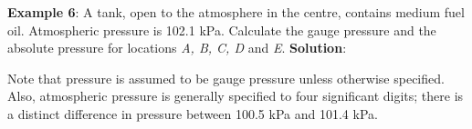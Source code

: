 \documentclass[10pt]{amsart}
\begin{document}
\begin{minipage}[t]{0.45\textwidth}
	\raggedright
	\textbf{Example 6}:
	A tank, open to the atmosphere in the centre, contains medium fuel
	oil. Atmospheric pressure is 102.1 kPa. Calculate the gauge pressure
	and the absolute pressure for locations \emph{A, B, C, D} and \emph{E}.
	\parb
	\textbf{Solution}:
	\parb
	
	\parb
	Note that pressure is assumed to be gauge pressure unless otherwise specified.\parb
	Also, atmospheric pressure is generally specified to four significant digits; there is a distinct
	difference in pressure between 100.5 kPa and 101.4 kPa.
	
	
	
	\parb
	
\end{minipage}
\hfill
\end{document}
